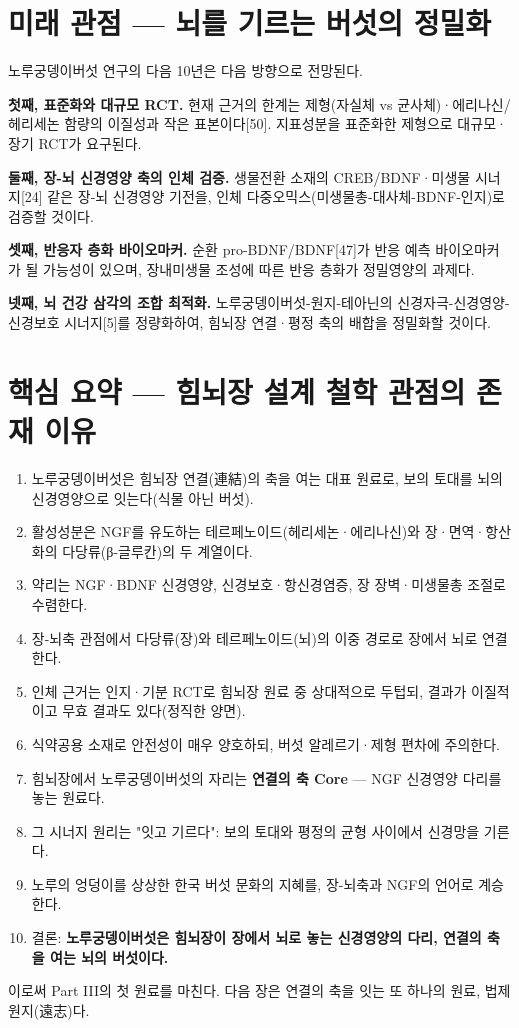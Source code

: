 \documentclass[11pt,oneside]{book}
\begin{document}
\section{미래 관점 — 뇌를 기르는 버섯의 정밀화}
노루궁뎅이버섯 연구의 다음 10년은 다음 방향으로 전망된다.

\textbf{첫째, 표준화와 대규모 RCT.} 현재 근거의 한계는 제형(자실체 vs 균사체)·에리나신/헤리세논 함량의 이질성과 작은 표본이다[50]. 지표성분을 표준화한 제형으로 대규모·장기 RCT가 요구된다.

\textbf{둘째, 장-뇌 신경영양 축의 인체 검증.} 생물전환 소재의 CREB/BDNF·미생물 시너지[24] 같은 장-뇌 신경영양 기전을, 인체 다중오믹스(미생물총-대사체-BDNF-인지)로 검증할 것이다.

\textbf{셋째, 반응자 층화 바이오마커.} 순환 pro-BDNF/BDNF[47]가 반응 예측 바이오마커가 될 가능성이 있으며, 장내미생물 조성에 따른 반응 층화가 정밀영양의 과제다.

\textbf{넷째, 뇌 건강 삼각의 조합 최적화.} 노루궁뎅이버섯-원지-테아닌의 신경자극-신경영양-신경보호 시너지[5]를 정량화하여, 힘뇌장 연결·평정 축의 배합을 정밀화할 것이다.

\section{핵심 요약 — 힘뇌장 설계 철학 관점의 존재 이유}
\begin{enumerate}[leftmargin=6mm,itemsep=1pt,topsep=2pt]
  \item 노루궁뎅이버섯은 힘뇌장 연결(連結)의 축을 여는 대표 원료로, 보의 토대를 뇌의 신경영양으로 잇는다(식물 아닌 버섯).
  \item 활성성분은 NGF를 유도하는 테르페노이드(헤리세논·에리나신)와 장·면역·항산화의 다당류(β-글루칸)의 두 계열이다.
  \item 약리는 NGF·BDNF 신경영양, 신경보호·항신경염증, 장 장벽·미생물총 조절로 수렴한다.
  \item 장-뇌축 관점에서 다당류(장)와 테르페노이드(뇌)의 이중 경로로 장에서 뇌로 연결한다.
  \item 인체 근거는 인지·기분 RCT로 힘뇌장 원료 중 상대적으로 두텁되, 결과가 이질적이고 무효 결과도 있다(정직한 양면).
  \item 식약공용 소재로 안전성이 매우 양호하되, 버섯 알레르기·제형 편차에 주의한다.
  \item 힘뇌장에서 노루궁뎅이버섯의 자리는 \textbf{연결의 축 Core} — NGF 신경영양 다리를 놓는 원료다.
  \item 그 시너지 원리는 "잇고 기르다": 보의 토대와 평정의 균형 사이에서 신경망을 기른다.
  \item 노루의 엉덩이를 상상한 한국 버섯 문화의 지혜를, 장-뇌축과 NGF의 언어로 계승한다.
  \item 결론: \textbf{노루궁뎅이버섯은 힘뇌장이 장에서 뇌로 놓는 신경영양의 다리, 연결의 축을 여는 뇌의 버섯이다.}
\end{enumerate}
이로써 Part III의 첫 원료를 마친다. 다음 장은 연결의 축을 잇는 또 하나의 원료, 법제 원지(遠志)다.
\end{document}
